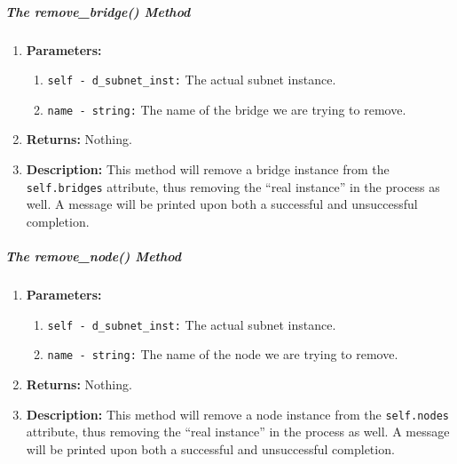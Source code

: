         \subparagraph{The remove\_bridge() Method}
            \begin{enumerate}
                \item \textbf{Parameters:}
                \begin{enumerate}
                    \item \texttt{self - d\_subnet\_inst:} The actual subnet instance.
                    \item \texttt{name - string:} The name of the bridge we are trying to remove.
                \end{enumerate}
                \item \textbf{Returns:} Nothing.
                \item \textbf{Description:} This method will remove a bridge instance from the \texttt{self.bridges} attribute, thus removing the ``real instance'' in the process as well. A message will be printed upon both a successful and unsuccessful completion.
            \end{enumerate}

        \subparagraph{The remove\_node() Method}
            \begin{enumerate}
                \item \textbf{Parameters:}
                \begin{enumerate}
                    \item \texttt{self - d\_subnet\_inst:} The actual subnet instance.
                    \item \texttt{name - string:} The name of the node we are trying to remove.
                \end{enumerate}
                \item \textbf{Returns:} Nothing.
                \item \textbf{Description:} This method will remove a node instance from the \texttt{self.nodes} attribute, thus removing the ``real instance'' in the process as well. A message will be printed upon both a successful and unsuccessful completion.
            \end{enumerate}


